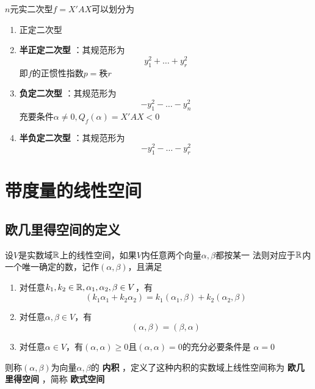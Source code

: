 \documentclass[11pt]{article}
\begin{document}
\(n\)元实二次型\(f=X'AX\)可以划分为
\begin{enumerate}
\item 正定二次型
\item \textbf{半正定二次型} ：其规范形为
\begin{equation*}
y_1^2+\dots+y_r^2
\end{equation*}
即\(f\)的正惯性指数\(p=\)秩\(r\)
\item \textbf{负定二次型} ：其规范形为
\begin{equation*}
-y_1^2-\dots-y_n^2
\end{equation*}
充要条件\(\alpha\neq0,Q_f(\alpha)=X'AX<0\)
\item \textbf{半负定二次型} ：其规范形为
\begin{equation*}
-y_1^2-\dots-y_r^2
\end{equation*}
\end{enumerate}
\section{带度量的线性空间}
\label{sec:orgb4f957e}
\subsection{欧几里得空间的定义}
\label{sec:orgb194dbf}
\begin{definition}[]
设\(V\)是实数域\(\mathbb{R}\)上的线性空间，如果\(V\)内任意两个向量\(\alpha,\beta\)都按某一
法则对应于\(\mathbb{R}\)内一个唯一确定的数，记作\((\alpha,\beta)\)，且满足
\begin{enumerate}
\item 对任意\(k_1,k_2\in\mathbb{R},\alpha_1,\alpha_2,\beta\in V\)，有
\begin{equation*}
(k_1\alpha_1+k_2\alpha_2)=k_1(\alpha_1,\beta)+k_2(\alpha_2,\beta)
\end{equation*}
\item 对任意\(\alpha,\beta\in V\)，有
\begin{equation*}
(\alpha,\beta)=(\beta,\alpha)
\end{equation*}
\item 对任意\(\alpha\in V\)，有\((\alpha,\alpha)\ge0\)且\((\alpha,\alpha)=0\)的充分必要条件是
\(\alpha=0\)
\end{enumerate}


则称\((\alpha,\beta)\)为向量\(\alpha,\beta\)的 \textbf{内积} ，定义了这种内积的实数域上线性空间称为
\textbf{欧几里得空间} ，简称 \textbf{欧式空间}
\end{definition}
\end{document}
